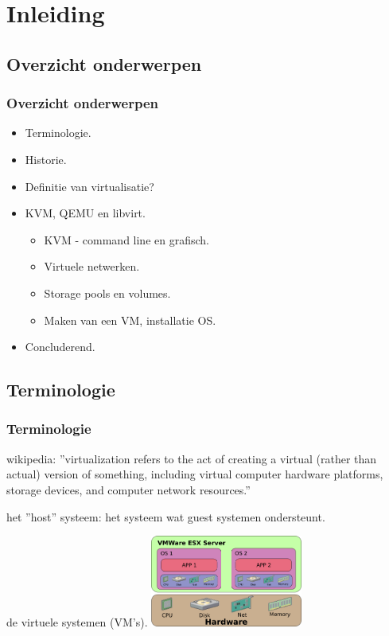 \section{Inleiding}
\subsection{Overzicht onderwerpen}
\begin{styleframe}
	\frametitle{Overzicht onderwerpen}
\begin{itemize}
\item Terminologie.
\item Historie.
\item Definitie van virtualisatie?
\item KVM, QEMU en libvirt.
\begin{itemize}
	\item KVM - command line en grafisch.
	\item Virtuele netwerken.
	\item Storage pools en volumes.
	\item Maken van een VM, installatie OS.
\end{itemize}
\item Concluderend.
\end{itemize}
\end{styleframe}

\subsection{Terminologie}
\begin{styleframe}
    \frametitle{Terminologie}
\begin{description}[blaat]
	\item[virtualisatie] wikipedia: ''virtualization refers to the act of creating a virtual (rather than actual) version of something, including virtual computer hardware platforms, storage devices, and computer network resources.''
	\pause
	\item[host] het ''host'' systeem: het systeem wat guest systemen ondersteunt.
	\pause
	\item[guest] de virtuele systemen (VM's).
	\pause
	\includegraphics[width=5cm]{img/VMware-schema.png}\\
\end{description}
\end{styleframe}

